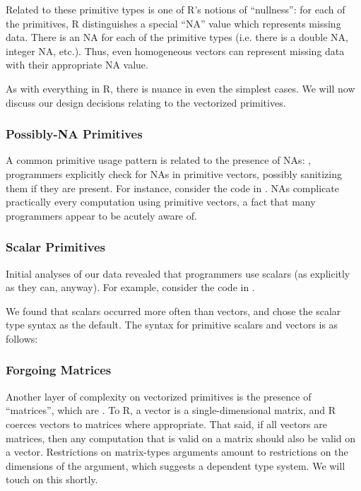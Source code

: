 \documentclass[acmsmall,review,anonymous]{acmart}\settopmatter{printfolios=true,printccs=false,printacmref=false}
\begin{document}
Related to these primitive types is one of R's notions of ``nullness'': for each of the primitives, R distinguishes a special ``NA'' value which represents missing data.
There is an NA for each of the primitive types (i.e. there is a double NA, integer NA, etc.).
Thus, even homogeneous vectors can represent missing data with their appropriate NA value.

As with everything in R, there is nuance in even the simplest cases.
We will now discuss our design decisions relating to the vectorized primitives.

%
%
\subsubsection{Possibly-NA Primitives}

A common primitive usage pattern is related to the presence of NAs: , programmers explicitly check for NAs in primitive vectors, possibly sanitizing them if they are present.
For instance, consider the code in .
NAs complicate practically every computation using primitive vectors, a fact that many programmers appear to be acutely aware of.

%
%
\subsubsection{Scalar Primitives}

Initial analyses of our data revealed that programmers  use scalars (as explicitly as they can, anyway).
For example, consider the code in .

We found that scalars occurred more often than vectors, and chose the scalar type syntax as the default.
The syntax for primitive scalars and vectors is as follows:

 
%
%
\subsubsection{Forgoing Matrices}

Another layer of complexity on vectorized primitives is the presence of ``matrices'', which are .
To R, a vector is a single-dimensional matrix, and R coerces vectors to matrices where appropriate.
That said, if all vectors are matrices, then any computation that is valid on a matrix should also be valid on a vector.
Restrictions on matrix-types arguments amount to restrictions on the dimensions of the argument, which suggests a dependent type system.
We will touch on this shortly.
 
\end{document}
